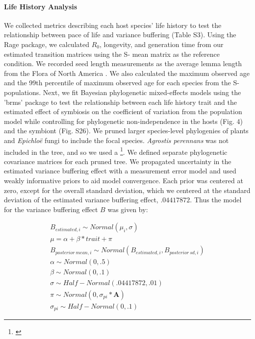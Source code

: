 \documentclass[12pt]{article}
\newcommand{\tom}[2]{{\color{red}{#1}}\footnote{\textit{\color{red}{#2}}}}
\begin{document}
\paragraph*{Life History Analysis}
We collected metrics describing each host species' life history to test the relationship between pace of life and variance buffering (Table S3). 
Using the Rage package, we calculated $R_0$, longevity, and generation time from our estimated transition matrices using the S- mean matrix as the reference condition.
We recorded seed length measurements as the average lemma length from the Flora of North America \cite{FloraNAonline}. 
We also calculated the maximum observed age and the 99th percentile of maximum observed age for each species from the S- populations.
Next, we fit Bayesian phylogenetic mixed-effects models using the 'brms' package \cite{Burkner2017brms} to test the relationship between each life history trait and the estimated effect of symbiosis on the coefficient of variation from the population model while controlling for phylogenetic non-independence in the hosts (Fig. 4) and the symbiont (Fig. S26).
We pruned larger species-level phylogenies of plants\cite{zanne2014three} and \emph{Epichlo\"{e}} fungi \cite{leuchtmann2014nomenclatural} to include the focal species.
\emph{Agrostis perennans} was not included in the tree, and so we used a \tom{congeneric species}{which one?}. 
We defined separate phylogenetic covariance matrices for each pruned tree.
We propagated uncertainty in the estimated variance buffering effect with a measurement error model and used weakly informative priors to aid model convergence.
Each prior was centered at zero, except for the overall standard deviation, which we centered at the standard deviation of the estimated variance buffering effect, $.04417872$.
Thus the model for the variance buffering effect $B$ was given by:


\begin{subequations}
	\begin{align}
		B_{estimated,i} \sim Normal(\mu_i,\sigma)\\
		\mu = \alpha + \beta*trait + \pi \\
		B_{posterior\ mean,i} \sim Normal(B_{estimated,i}, B_{posterior\ sd,i})\\
		\alpha \sim Normal(0,.5)\\
		\beta \sim Normal(0,.1)\\
		\sigma \sim Half-Normal(.04417872,.01)\\
		\pi \sim Normal(0,\sigma_{pi}*\mathbf{A})\\
		\sigma_{pi} \sim Half-Normal(0,.1)
	\end{align}
\end{subequations}
\end{document}
